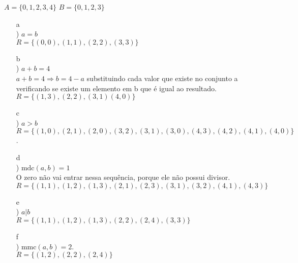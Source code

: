 \documentclass{article}
\begin{document}
$A = \{0, 1, 2, 3, 4\}$  $B = \{0, 1, 2, 3\}$ \\
\begin{enumerate}
    \item[a\\)] $a = b$ \\ 
    $R = \{(0,0), (1,1), (2, 2), (3, 3)\}$
    \item[b\\)] $a + b = 4$ \\
    $a + b = 4 \Rightarrow b = 4 - a$
    substituindo cada valor que existe no conjunto a 
    verificando se existe um elemento em b que é igual
    ao resultado. \\ $R = \{(1, 3), (2, 2), (3, 1) (4, 0)\}$
    \item[c\\)] $a > b$ \\ 
    $R = \{(1,0), (2, 1), (2, 0), (3, 2), (3, 1), (3,0), (4, 3), (4, 2), (4, 1), (4, 0) \}$.
    \item[d\\)] $\text{mdc}(a, b) = 1$ \\
    O zero não vai entrar 
    nessa sequência, porque ele não possui divisor.\\
    $R = \{(1,1), (1,2), (1,3), (2, 1), (2, 3), (3, 1), 
    (3, 2) , (4, 1), (4, 3)\}$
    \item[e\\)] $a | b$ \\
    $R = \{(1,1), (1, 2), (1, 3), (2, 2), (2, 4), (3, 3)\}$
    \item[f\\)] $\text{mmc}(a, b) = 2$. \\
    $R = \{(1, 2), (2, 2), (2, 4)\}$
\end{enumerate}
\end{document}
